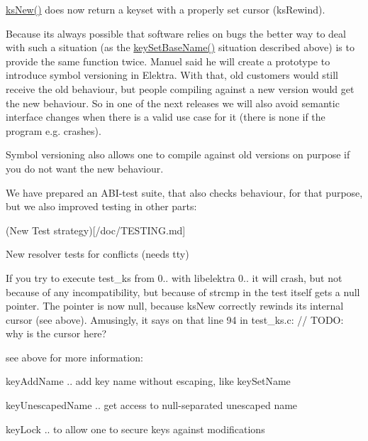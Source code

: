 \mbox{\hyperlink{group__keyset_ga671e1aaee3ae9dc13b4834a4ddbd2c3c}{ks\+New()}} does now return a keyset with a properly set cursor (ks\+Rewind).

Because its always possible that software relies on bugs the better way to deal with such a situation (as the \mbox{\hyperlink{group__keyname_ga6e804bd453f98c28b0ff51430d1df407}{key\+Set\+Base\+Name()}} situation described above) is to provide the same function twice. Manuel said he will create a prototype to introduce symbol versioning in Elektra. With that, old customers would still receive the old behaviour, but people compiling against a new version would get the new behaviour. So in one of the next releases we will also avoid semantic interface changes when there is a valid use case for it (there is none if the program e.\+g. crashes).

Symbol versioning also allows one to compile against old versions on purpose if you do not want the new behaviour.

We have prepared an A\+B\+I-\/test suite, that also checks behaviour, for that purpose, but we also improved testing in other parts\+:


\begin{DoxyItemize}
\item (New Test strategy)\mbox{[}/doc/\+T\+E\+S\+T\+I\+NG.md\mbox{]}
\item New resolver tests for conflicts (needs tty)
\end{DoxyItemize}

If you try to execute test\+\_\+ks from 0.. with libelektra 0.. it will crash, but not because of any incompatibility, but because of {\ttfamily strcmp} in the test itself gets a null pointer. The pointer is now null, because ks\+New correctly rewinds its internal cursor (see above). Amusingly, it says on that line 94 in test\+\_\+ks.\+c\+: // T\+O\+DO\+: why is the cursor here?

see above for more information\+:


\begin{DoxyItemize}
\item {\ttfamily key\+Add\+Name} .. add key name without escaping, like key\+Set\+Name
\item {\ttfamily key\+Unescaped\+Name} .. get access to null-\/separated unescaped name
\item {\ttfamily key\+Lock} .. to allow one to secure keys against modifications
\end{DoxyItemize}

